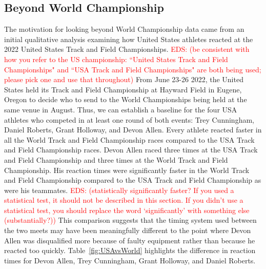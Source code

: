 \documentclass[12pt, letterpaper, titlepage]{article}
\newcommand{\eds}[1]{\textcolor{red}{EDS: (#1)}}
\begin{document}
\subsection{Beyond World Championship}
The motivation for looking beyond World Championship data came from an 
initial qualitative analysis examining how United States athletes reacted at the 
2022 United States Track and Field Championships.
\eds{be consistent with how you refer to the US championship:
``United States Track and Field Championships" and ``USA Track and Field 
Championships" are both being used; please pick one and use that throughout}
From June 23-26 2022, the United States held its Track
and Field Championship at Hayward 
Field in Eugene, Oregon to decide who to send to the World Championships 
being held at the same venue in August. %
Thus, we can establish a baseline for the four USA athletes who 
competed in at least one round of both events: Trey Cunningham, Daniel Roberts, 
Grant Holloway, and Devon Allen. Every athlete reacted faster in all the World 
Track and Field Championship races compared to the USA Track and Field 
Championship races. Devon Allen raced three times at the USA Track and
Field Championship and three times at the World Track and Field Championship. 
His reaction times were significantly faster in the World Track and
Field Championship compared to the USA Track and Field Championship as were his
teammates. \eds{statistically significantly faster? If you used a statistical 
test, it should not be described in this section.  If you didn't use a 
statistical test, you should replace the word `significantly' with something 
else (substantially?)} 
This comparison suggests that the timing system used between the two
meets may have been meaningfully different to the point where Devon Allen was
disqualified more because of faulty equipment rather than because he reacted
too quickly.  Table~\ref{fig:USAvsWorld} highlights the difference in reaction 
times for Devon Allen, Trey Cunningham, Grant Holloway, and Daniel Roberts. 
\end{document}

